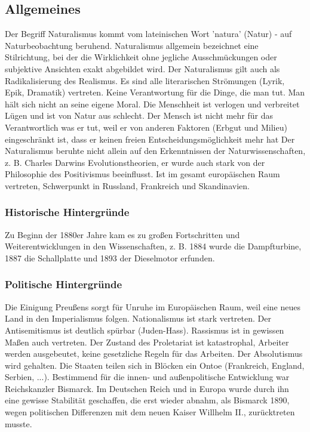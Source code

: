 \documentclass[12pt,a4paper]{article}
\begin{document}
\subsection{Allgemeines}

Der Begriff Naturalismus kommt vom lateinischen Wort 'natura' (Natur) - auf Naturbeobachtung beruhend. Naturalismus allgemein bezeichnet eine Stilrichtung, bei der die Wirklichkeit ohne jegliche Ausschmückungen oder subjektive Ansichten exakt abgebildet wird. Der Naturalismus gilt auch als Radikalisierung des Realismus. Es sind alle literarischen Strömungen (Lyrik, Epik, Dramatik) vertreten. 
\newline
\newline
Keine Verantwortung für die Dinge, die man tut. Man hält sich nicht an seine eigene Moral. Die Menschheit ist verlogen und verbreitet Lügen und ist von Natur aus schlecht. Der Mensch ist nicht mehr für das Verantwortlich was er tut, weil er von anderen Faktoren (Erbgut und Milieu) eingeschränkt ist, dass er keinen freien Entscheidungsmöglichkeit mehr hat
\newline
\newline
Der Naturalismus beruhte nicht allein auf den Erkenntnissen der Naturwissenschaften, z. B. Charles Darwins Evolutionstheorien, er wurde auch stark von der Philosophie des Positivismus beeinflusst. Ist im gesamt europäischen Raum vertreten, Schwerpunkt in Russland, Frankreich und Skandinavien.
	
\subsubsection{Historische Hintergründe}	

Zu Beginn der 1880er Jahre kam es zu großen Fortschritten und Weiterentwicklungen in den Wissenschaften, z. B. 1884 wurde die Dampfturbine, 1887 die Schallplatte und 1893 der Dieselmotor erfunden.

\subsubsection{Politische Hintergründe}

Die Einigung Preußens sorgt für Unruhe im Europäischen Raum, weil eine neues Land in den Imperialismus folgen. Nationalismus ist stark vertreten. Der Antisemitismus ist deutlich spürbar (Juden-Hass). Rassismus ist in gewissen Maßen auch vertreten. Der Zustand des Proletariat ist katastrophal, Arbeiter werden ausgebeutet, keine gesetzliche Regeln für das Arbeiten. Der Absolutismus wird gehalten. Die Staaten teilen sich in Blöcken ein Ontoe (Frankreich, England, Serbien, ...).	
\newline
Bestimmend für die innen- und außenpolitische Entwicklung war Reichskanzler Bismarck. Im Deutschen Reich und in Europa wurde durch ihn eine gewisse Stabilität geschaffen, die erst wieder abnahm, als Bismarck 1890, wegen politischen Differenzen mit dem neuen Kaiser Willhelm II., zurücktreten musste.
	
\end{document}
